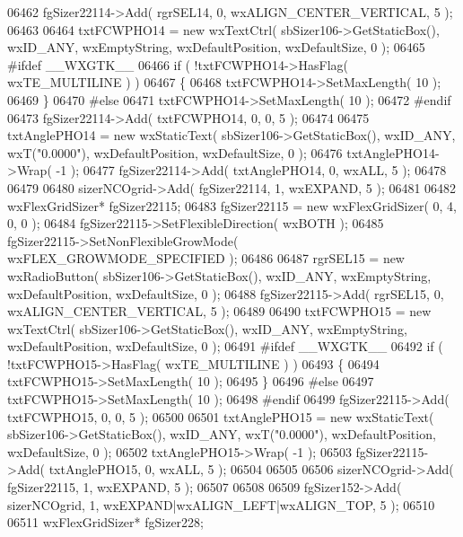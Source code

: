 \begin{DoxyCode}
06462     fgSizer22114->Add( rgrSEL14, 0, wxALIGN\_CENTER\_VERTICAL, 5 );
06463     
06464     txtFCWPHO14 = \textcolor{keyword}{new} wxTextCtrl( sbSizer106->GetStaticBox(), wxID\_ANY, wxEmptyString, wxDefaultPosition, 
      wxDefaultSize, 0 );
06465 \textcolor{preprocessor}{    #ifdef \_\_WXGTK\_\_}
06466     \textcolor{keywordflow}{if} ( !txtFCWPHO14->HasFlag( wxTE\_MULTILINE ) )
06467     \{
06468     txtFCWPHO14->SetMaxLength( 10 );
06469     \}
06470 \textcolor{preprocessor}{    #else}
06471     txtFCWPHO14->SetMaxLength( 10 );
06472 \textcolor{preprocessor}{    #endif}
06473     fgSizer22114->Add( txtFCWPHO14, 0, 0, 5 );
06474     
06475     txtAnglePHO14 = \textcolor{keyword}{new} wxStaticText( sbSizer106->GetStaticBox(), wxID\_ANY, wxT(\textcolor{stringliteral}{"0.0000"}), 
      wxDefaultPosition, wxDefaultSize, 0 );
06476     txtAnglePHO14->Wrap( -1 );
06477     fgSizer22114->Add( txtAnglePHO14, 0, wxALL, 5 );
06478     
06479     
06480     sizerNCOgrid->Add( fgSizer22114, 1, wxEXPAND, 5 );
06481     
06482     wxFlexGridSizer* fgSizer22115;
06483     fgSizer22115 = \textcolor{keyword}{new} wxFlexGridSizer( 0, 4, 0, 0 );
06484     fgSizer22115->SetFlexibleDirection( wxBOTH );
06485     fgSizer22115->SetNonFlexibleGrowMode( wxFLEX\_GROWMODE\_SPECIFIED );
06486     
06487     rgrSEL15 = \textcolor{keyword}{new} wxRadioButton( sbSizer106->GetStaticBox(), wxID\_ANY, wxEmptyString, wxDefaultPosition, 
      wxDefaultSize, 0 );
06488     fgSizer22115->Add( rgrSEL15, 0, wxALIGN\_CENTER\_VERTICAL, 5 );
06489     
06490     txtFCWPHO15 = \textcolor{keyword}{new} wxTextCtrl( sbSizer106->GetStaticBox(), wxID\_ANY, wxEmptyString, wxDefaultPosition, 
      wxDefaultSize, 0 );
06491 \textcolor{preprocessor}{    #ifdef \_\_WXGTK\_\_}
06492     \textcolor{keywordflow}{if} ( !txtFCWPHO15->HasFlag( wxTE\_MULTILINE ) )
06493     \{
06494     txtFCWPHO15->SetMaxLength( 10 );
06495     \}
06496 \textcolor{preprocessor}{    #else}
06497     txtFCWPHO15->SetMaxLength( 10 );
06498 \textcolor{preprocessor}{    #endif}
06499     fgSizer22115->Add( txtFCWPHO15, 0, 0, 5 );
06500     
06501     txtAnglePHO15 = \textcolor{keyword}{new} wxStaticText( sbSizer106->GetStaticBox(), wxID\_ANY, wxT(\textcolor{stringliteral}{"0.0000"}), 
      wxDefaultPosition, wxDefaultSize, 0 );
06502     txtAnglePHO15->Wrap( -1 );
06503     fgSizer22115->Add( txtAnglePHO15, 0, wxALL, 5 );
06504     
06505     
06506     sizerNCOgrid->Add( fgSizer22115, 1, wxEXPAND, 5 );
06507     
06508     
06509     fgSizer152->Add( sizerNCOgrid, 1, wxEXPAND|wxALIGN\_LEFT|wxALIGN\_TOP, 5 );
06510     
06511     wxFlexGridSizer* fgSizer228;

\end{DoxyCode}
